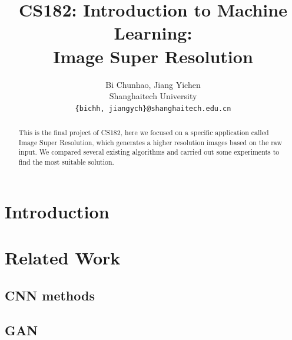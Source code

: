 \documentclass[10pt,twocolumn,letterpaper]{article}
\begin{document}
\title{CS182: Introduction to Machine Learning: \\ Image Super Resolution}

\author{Bi Chunhao, Jiang Yichen\\
Shanghaitech University\\
 {\tt\small \{bichh, jiangych\}@shanghaitech.edu.cn}
}

\maketitle

\begin{abstract}
This is the final project of CS182, here we focused on a specific application called Image Super Resolution,
which generates a higher resolution images based on the raw input. 
We compared several existing algorithms and carried out some experiments to find the most suitable solution.
\end{abstract}

\section{Introduction}

\section{Related Work}
\subsection{CNN methods}
\subsection{GAN}
\end{document}
